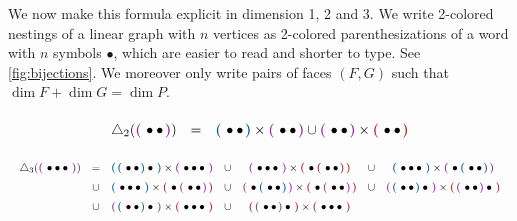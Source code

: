 \documentclass[twoside, 11pt]{amsart}
\theoremstyle{remark}
\begin{document}
We now make this formula explicit in dimension 1, 2 and 3. 
We write 2-colored nestings of a linear graph with $n$ vertices as 2-colored parenthesizations of a word with $n$ symbols $\bullet$, which are easier to read and shorter to type. See \cref{fig:bijections}. 
We moreover only write pairs of faces $(F,G)$ such that $\dim F + \dim G = \dim P$.

\begin{equation*}
  \begin{matrix}
      \triangle_2(\purple{\bullet \bullet}) & = & \blue{\bullet \bullet} \times \purple{\bullet \bullet} \cup \purple{\bullet \bullet} \times \red{\bullet \bullet}
  \end{matrix}
\end{equation*}

\[ \resizebox{\hsize}{!}{$\displaystyle{ 
 \renewcommand*{\arraystretch}{1.5}
  \begin{matrix}
      \triangle_3(\purple{\bullet \bullet \bullet}) 
      & = & \blue{\blue{\bullet \bullet} \bullet} \times \purple{\bullet \bullet \bullet} 
      & \cup & \purple{\bullet \bullet \bullet} \times \red{\bullet \red{\bullet \bullet}}
      & \cup & \blue{\bullet \bullet \bullet} \times \purple{\bullet \blue{\bullet \bullet}} \\
      & \cup & \blue{\bullet \bullet \bullet} \times \red{\bullet \purple{\bullet \bullet}}  
      & \cup & \purple{\bullet \blue{\bullet \bullet}} \times \red{\bullet \purple{\bullet \bullet}} 
      & \cup & \purple{\blue{\bullet \bullet} \bullet} \times \red{\purple{\bullet \bullet} \bullet} \\
      & \cup & \purple{\blue{\bullet \bullet} \bullet} \times \red{\bullet \bullet \bullet} 
      & \cup & \red{\purple{\bullet \bullet} \bullet} \times \red{\bullet \bullet \bullet} 
  \end{matrix} }$} \]
 
\end{document}
